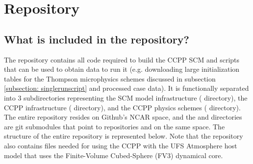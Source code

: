 \chapter{Repository}
\label{chapter: repository}

\section{What is included in the repository?}
The repository contains all code required to build the CCPP SCM and scripts that can be used to obtain data to run it (e.g. downloading large initialization tables for the Thompson microphysics schemes discussed in subsection \ref{subsection: singlerunscript} and processed case data). It is functionally separated into 3 subdirectories representing the SCM model infrastructure ( directory), the CCPP infrastructure ( directory), and the CCPP physics schemes ( directory). The entire  repository resides on Github's NCAR space, and the  and  directories are git submodules that point to repositories  and  on the same space. The structure of the entire repository is represented below. Note that the  repository also contains files needed for using the CCPP with the UFS Atmosphere host model that uses the Finite-Volume Cubed-Sphere (FV3) dynamical core.

